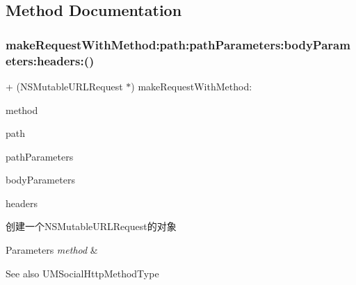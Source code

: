 \subsection{Method Documentation}
\mbox{\label{interface_u_m_social_http_factory_a8424dae8943b41540d506e98b26a8fd7}} 
\subsubsection{\texorpdfstring{make\+Request\+With\+Method\+:path\+:path\+Parameters\+:body\+Parameters\+:headers\+:()}{makeRequestWithMethod:path:pathParameters:bodyParameters:headers:()}\hspace{0.1cm}{\footnotesize\ttfamily [1/2]}}
{\footnotesize\ttfamily + (N\+S\+Mutable\+U\+R\+L\+Request $\ast$) make\+Request\+With\+Method\+: \begin{DoxyParamCaption}\item[{(U\+M\+Social\+Http\+Method\+Type)}]{method }\item[{path:(N\+S\+String $\ast$)}]{path }\item[{pathParameters:(N\+S\+Dictionary $\ast$)}]{path\+Parameters }\item[{bodyParameters:(N\+S\+Dictionary $\ast$)}]{body\+Parameters }\item[{headers:(N\+S\+Dictionary $\ast$)}]{headers }\end{DoxyParamCaption}}

创建一个\+N\+S\+Mutable\+U\+R\+L\+Request的对象


\begin{DoxyParams}{Parameters}
{\em method} & \\
\hline
\end{DoxyParams}
\begin{DoxySeeAlso}{See also}
U\+M\+Social\+Http\+Method\+Type 
\end{DoxySeeAlso}

